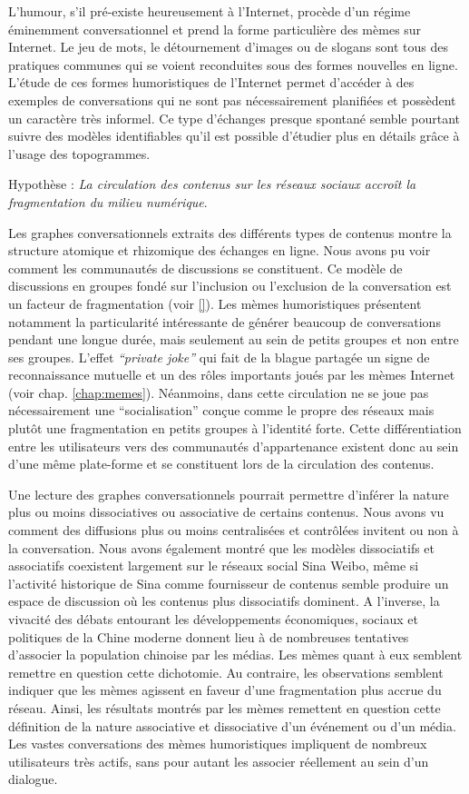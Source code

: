L'humour, s'il pré-existe heureusement à l'Internet, procède d'un régime éminemment conversationnel et prend la forme particulière des mèmes sur Internet. Le jeu de mots, le détournement d'images ou de slogans sont tous des pratiques communes qui se voient reconduites sous des formes nouvelles en ligne. L'étude de ces formes humoristiques de l'Internet permet d'accéder à des exemples de conversations qui ne sont pas nécessairement planifiées et possèdent un caractère très informel. Ce type d'échanges presque spontané semble pourtant suivre des modèles identifiables qu'il est possible d'étudier plus en détails grâce à l'usage des topogrammes. 

Hypothèse : \textit{La circulation des contenus sur les réseaux sociaux accroît la fragmentation du milieu numérique}.

Les graphes conversationnels extraits des différents types de contenus montre la structure atomique et rhizomique des échanges en ligne. Nous avons pu voir comment les communautés de discussions se constituent. Ce modèle de discussions en groupes fondé sur l'inclusion ou l'exclusion de la conversation est un facteur de fragmentation (voir \ref{}). Les mèmes humoristiques présentent notamment la particularité intéressante de générer beaucoup de conversations pendant une longue durée, mais seulement au sein de petits groupes et non entre ses groupes. L'effet \textit{``private joke''} qui fait de la blague partagée un signe de reconnaissance mutuelle et un des rôles importants joués par les mèmes Internet (voir chap. \ref{chap:memes}). Néanmoins, dans cette circulation ne se joue pas nécessairement une ``socialisation'' conçue comme le propre des réseaux mais plutôt une fragmentation en petits groupes à l'identité forte. Cette différentiation entre les utilisateurs vers des communautés d'appartenance existent donc au sein d'une même plate-forme et se constituent lors de la circulation des contenus. 

Une lecture des graphes conversationnels pourrait permettre d'inférer la nature plus ou moins dissociatives ou associative de certains contenus. Nous avons vu comment des diffusions plus ou moins centralisées et contrôlées invitent ou non à la conversation. Nous avons également montré que les modèles dissociatifs et associatifs coexistent largement sur le réseaux social Sina Weibo, même si l'activité historique de Sina comme fournisseur de contenus semble produire un espace de discussion où les contenus plus dissociatifs dominent. A l{\textquoteright}inverse, la vivacité des débats entourant les développements économiques, sociaux et politiques de la Chine moderne donnent lieu à de nombreuses tentatives d{\textquoteright}associer la population chinoise par les médias. Les mèmes quant à eux semblent remettre en question cette dichotomie. Au contraire, les observations semblent indiquer que les mèmes agissent en faveur d'une fragmentation plus accrue du réseau. Ainsi, les résultats montrés par les mèmes remettent en question cette définition de la nature associative et dissociative d'un événement ou d'un média. Les vastes conversations des mèmes humoristiques impliquent de nombreux utilisateurs très actifs, sans pour autant les associer réellement au sein d'un dialogue. 

